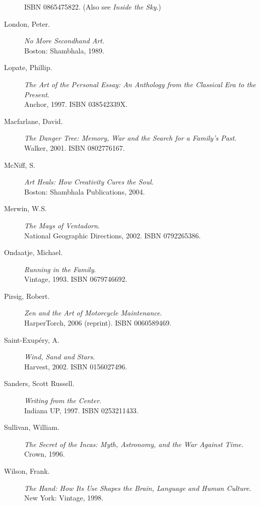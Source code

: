 \documentclass[letterpaper,10pt,headsepline]{scrreprt}
\begin{document}
\begin{description}
  \textsc{ISBN 0865475822}. (Also see \textit{Inside the Sky}.)
\item [London, Peter.] \textit{No More Secondhand Art.} 
\\Boston: Shambhala, 1989.
\item [Lopate, Phillip.] \textit{The Art of the Personal Essay: An
    Anthology from the Classical Era to the Present}. \\Anchor, 1997.
  \textsc{ISBN 038542339X}.
\item [Macfarlane, David.] \textit{The Danger Tree: Memory, War and
    the Search for a Family's Past}. \\Walker, 2001. \textsc{ISBN
    0802776167}.
\item[McNiff, S.] \textit{Art Heals: How Creativity Cures the Soul.} \\Boston: Shambhala Publications, 2004.
\item [Merwin, W.S.] \textit{The Mays of Ventadorn}. \\National
  Geographic Directions, 2002. \textsc{ISBN 0792265386}.
\item [Ondaatje, Michael.] \textit{Running in the Family}. \\Vintage,
  1993. \textsc{ISBN 0679746692}.
\item [Pirsig, Robert.] \textit{Zen and the Art of Motorcycle
    Maintenance}. \\HarperTorch, 2006 (reprint). \textsc{ISBN
    0060589469}.
\item [Saint-Exup\'ery, A.] \textit{Wind, Sand and Stars}. \\Harvest,
  2002. \textsc{ISBN 0156027496}.
\item [Sanders, Scott Russell.] \textit{Writing from the Center}.
  \\Indiana UP, 1997. \textsc{ISBN 0253211433}.
\item [Sullivan, William.] \textit{The Secret of the Incas: Myth,
    Astronomy, and the War Against Time.} \\Crown, 1996.
\item[Wilson, Frank.] \textit{The Hand: How Its Use Shapes the Brain, Language and Human Culture.}
\\New York: Vintage, 1998.

\end{description}
\end{document}
